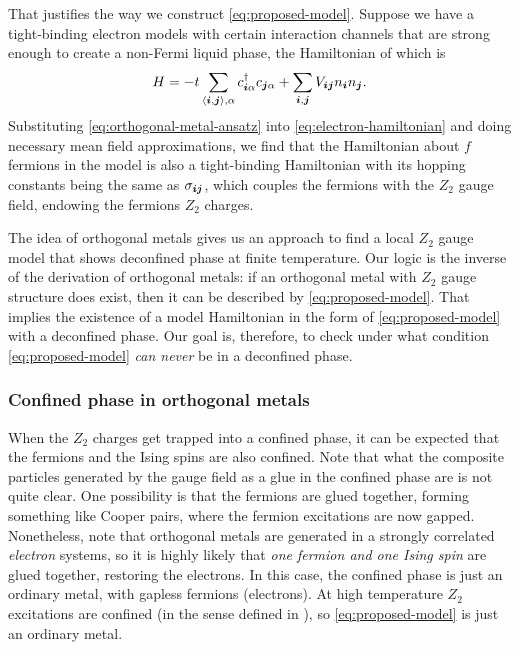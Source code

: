 \documentclass[hyperref, a4paper]{article}
\newcommand*{\pair}[1]{\langle #1 \rangle}
\newcommand*{\Ztwo}{\texorpdfstring{$\mathbb{Z}_2$ }{Z2 }}
\def\mathbb#1{#1}%
\begin{document}
That justifies the way we construct \eqref{eq:proposed-model}.
Suppose we have a tight-binding electron models with certain interaction channels that are strong enough to create a non-Fermi liquid phase, the Hamiltonian of which is 
\begin{equation}
    H = - t \sum_{\pair{\vb*{i}, \vb*{j}}, \alpha} c^\dagger_{\vb*{i} \alpha} c_{\vb*{j} \alpha} + \sum_{\vb*{i}, \vb*{j}} V_{\vb*{i} \vb*{j}} n_{\vb*{i}} n_{\vb*{j}}.
    \label{eq:electron-hamiltonian}
\end{equation}
Substituting \eqref{eq:orthogonal-metal-ansatz} into \eqref{eq:electron-hamiltonian} and doing necessary mean field approximations, we find that the Hamiltonian about $f$ fermions in the model is also a tight-binding Hamiltonian with its hopping constants being the same as $\sigma_{\vb*{i} \vb*{j}}$, which couples the fermions with the \Ztwo gauge field, endowing the fermions \Ztwo charges.

The idea of orthogonal metals gives us an approach to find a local \Ztwo gauge model that shows deconfined phase at finite temperature.
Our logic is the inverse of the derivation of orthogonal metals: if an orthogonal metal with \Ztwo gauge structure does exist, then it can be described by \eqref{eq:proposed-model}.
That implies the existence of a model Hamiltonian in the form of \eqref{eq:proposed-model} with a deconfined phase.
Our goal is, therefore, to check under what condition \eqref{eq:proposed-model} \emph{can never} be in a deconfined phase.

\subsubsection{Confined phase in orthogonal metals}

When the \Ztwo charges get trapped into a confined phase, it can be expected that the fermions and the Ising spins are also confined.
Note that what the composite particles generated by the gauge field as a glue in the confined phase are is not quite clear.
One possibility is that the fermions are glued together, forming something like Cooper pairs, where the fermion excitations are now gapped.
Nonetheless, note that orthogonal metals are generated in a strongly correlated \emph{electron} systems, so it is highly likely that \emph{one fermion and one Ising spin} are glued together, restoring the electrons.
In this case, the confined phase is just an ordinary metal, with gapless fermions (electrons).
At high temperature \Ztwo excitations are confined (in the sense defined in ), so \eqref{eq:proposed-model} is just an ordinary metal.
\end{document}
